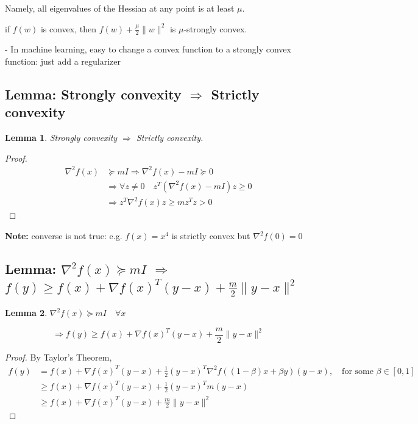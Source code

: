 \documentclass[11pt,a4paper]{article}
\newtheorem{lemma}{Lemma}
\begin{document}
Namely, all eigenvalues of the Hessian at any point is at least $\mu$.

if $f(w)$ is convex, then $f(w)+\frac{\mu}{2}\|w\|^{2}$ is $\mu$-strongly convex.

- In machine learning, easy to change a convex function to a strongly convex function: just add a regularizer

\subsection{Lemma: Strongly convexity $\Rightarrow$ Strictly convexity}
\begin{lemma}
    Strongly convexity $\Rightarrow$ Strictly convexity.
\end{lemma}
\begin{proof}
\begin{equation}
    \begin{aligned}
        \nabla^2 f(x)&\succeq mI \Rightarrow \nabla^2 f(x)-mI\succeq 0\\
        & \Rightarrow \forall z\neq 0\quad z^T(\nabla^2 f(x)-mI)z\geq 0\\
        & \Rightarrow z^T\nabla^2 f(x)z\geq mz^Tz>0
    \end{aligned}
    \nonumber
\end{equation}
\end{proof}
\textbf{Note: }converse is not true: e.g. $f(x)=x^4$ is strictly convex but $\nabla^2 f(0)=0$

\subsection{Lemma: $\nabla^2 f(x)\succeq mI$ $\Rightarrow$ $f(y)\geq f(x)+\nabla f(x)^T(y-x)+\frac{m}{2}\|y-x\|^2$}
\begin{lemma}
$\nabla^2 f(x)\succeq mI\quad \forall x$

$$\Rightarrow f(y)\geq f(x)+\nabla f(x)^T(y-x)+\frac{m}{2}\|y-x\|^2$$
\end{lemma}
\begin{proof}
    By Taylor's Theorem,
    \begin{equation}
        \begin{aligned}
            f(y)&=f(x)+\nabla f(x)^T(y-x)+\frac{1}{2}(y-x)^T \nabla^2 f((1-\beta)x+\beta y)(y-x),\quad \text{for some }\beta\in[0,1]\\
            &\geq f(x)+\nabla f(x)^T(y-x)+\frac{1}{2}(y-x)^Tm(y-x)\\
            &\geq f(x)+\nabla f(x)^T(y-x)+\frac{m}{2}\|y-x\|^2
        \end{aligned}
        \nonumber
    \end{equation}
\end{proof}
\end{document}
